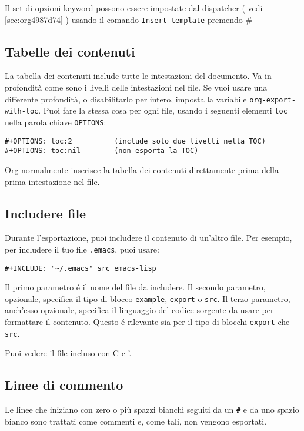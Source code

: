\documentclass[11pt]{article}
\begin{document}
Il set di opzioni keyword possono essere impostate dal dispatcher (
vedi \ref{sec:org4987d74} ) usando il comando \texttt{Insert
template} premendo \#

\subsection{Tabelle dei contenuti}
\label{sec:orgb1f2973}
La tabella dei contenuti include tutte le intestazioni del
documento. Va in profondità come sono i livelli delle intestazioni nel
file. Se vuoi usare una differente profondità, o disabilitarlo per
intero, imposta la variabile \texttt{org-export-with-toc}. Puoi fare la
stessa cosa per ogni file, usando i seguenti elementi \texttt{toc} nella
parola chiave \texttt{OPTIONS}:

\begin{verbatim}
#+OPTIONS: toc:2          (include solo due livelli nella TOC)
#+OPTIONS: toc:nil        (non esporta la TOC)
\end{verbatim}

Org normalmente inserisce la tabella dei contenuti direttamente prima
della prima intestazione nel file.

\subsection{Includere file}
\label{sec:org86a3fec}
Durante l'esportazione, puoi includere il contenuto di un'altro
file. Per esempio, per includere il tuo file \texttt{.emacs}, puoi usare:

\begin{verbatim}
#+INCLUDE: "~/.emacs" src emacs-lisp
\end{verbatim}


Il primo parametro é il nome del file da includere. Il secondo
parametro, opzionale, specifica il tipo di blocco \texttt{example}, \texttt{export}
o \texttt{src}. Il terzo parametro, anch'esso opzionale, specifica il
linguaggio del codice sorgente da usare per formattare il
contenuto. Questo é rilevante sia per il tipo di blocchi \texttt{export} che
\texttt{src}.

Puoi vedere il file incluso con C-c '.

\subsection{Linee di commento}
\label{sec:org2f4c58b}
Le linee che iniziano con zero o più spazzi bianchi seguiti da un \texttt{\#}
e da uno spazio bianco sono trattati come commenti e, come tali, non
vengono esportati.
\end{document}
